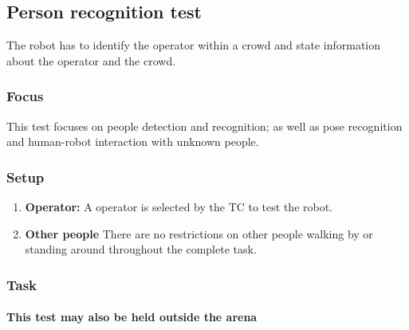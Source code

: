 \subsection{Person recognition test}

The robot has to identify the operator within a crowd and state information about the operator and the crowd.

\subsubsection{Focus}

This test focuses on people detection and recognition; as well as pose recognition and human-robot interaction with unknown people.

\subsubsection{Setup}

\begin{enumerate}
\item \textbf{Operator:} A  operator is selected by the TC to test the robot.
\item \textbf{Other people} There are no restrictions on other people walking by or standing around throughout the complete task.
\end{enumerate}

\subsubsection{Task}
\paragraph{This test may also be held outside the arena}

